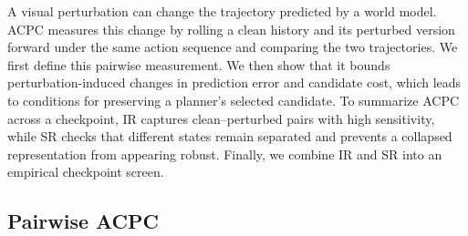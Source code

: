\documentclass[10pt]{article}
\begin{document}
A visual perturbation can change the trajectory predicted by a world model.
ACPC measures this change by rolling a clean history and its perturbed version
forward under the same action sequence and comparing the two trajectories. We
first define this pairwise measurement. We then
show that it bounds perturbation-induced changes in prediction error and
candidate cost, which leads to conditions for preserving a planner's selected
candidate. To summarize ACPC across a checkpoint, IR captures
clean--perturbed pairs with high sensitivity, while SR checks that different
states remain separated and prevents a collapsed representation from
appearing robust. Finally, we combine IR and SR into an empirical checkpoint
screen.

\subsection{Pairwise ACPC}\label{sec:acpc-def}
\end{document}
